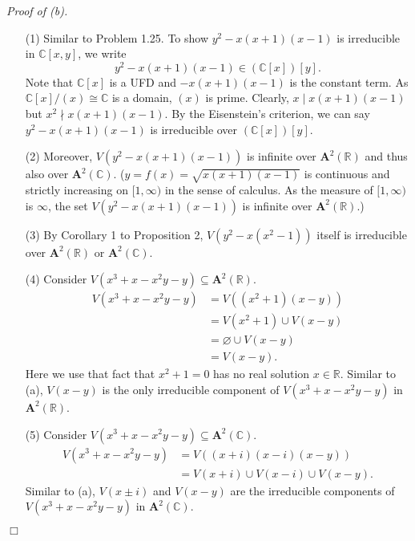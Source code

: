 \documentclass{article}
\begin{document}
\emph{Proof of (b).}
\begin{enumerate}
\item[(1)]
  Similar to Problem 1.25.
  To show $y^2 - x(x+1)(x-1)$ is irreducible in $\mathbb{C}[x,y]$,
  we write
  \[
    y^2 - x(x+1)(x-1) \in (\mathbb{C}[x])[y].
  \]
  Note that $\mathbb{C}[x]$ is a UFD and $-x(x+1)(x-1)$ is the constant term.
  As $\mathbb{C}[x]/(x) \cong \mathbb{C}$ is a domain, $(x)$ is prime.
  Clearly, $x \mid x(x+1)(x-1)$ but $x^2 \nmid x(x+1)(x-1)$.
  By the Eisenstein's criterion,
  we can say $y^2 - x(x+1)(x-1)$ is irreducible over $(\mathbb{C}[x])[y]$.

\item[(2)]
  Moreover, $V(y^2 - x(x+1)(x-1))$ is infinite over $\mathbf{A}^2(\mathbb{R})$
  and thus also over $\mathbf{A}^2(\mathbb{C})$.
  ($y = f(x) = \sqrt{x(x+1)(x-1)}$ is continuous and strictly increasing on $[1,\infty)$
  in the sense of calculus.
  As the measure of $[1,\infty)$ is $\infty$, the set $V(y^2 - x(x+1)(x-1))$ is infinite
  over $\mathbf{A}^2(\mathbb{R})$.)

\item[(3)]
  By Corollary 1 to Proposition 2,
  $V(y^2 - x(x^2-1))$ itself is irreducible over $\mathbf{A}^2(\mathbb{R})$
  or $\mathbf{A}^2(\mathbb{C})$.

\item[(4)]
  Consider $V(x^3+x-x^2y-y) \subseteq \mathbf{A}^2(\mathbb{R})$.
  \begin{align*}
    V(x^3+x-x^2y-y)
    &= V((x^2 + 1)(x - y)) \\
    &= V(x^2 + 1) \cup V(x - y) \\
    &= \varnothing \cup V(x - y) \\
    &= V(x - y).
  \end{align*}
  Here we use that fact that
  $x^2 + 1 = 0$ has no real solution $x \in \mathbb{R}$.
  Similar to (a), $V(x - y)$ is the only irreducible component of $V(x^3+x-x^2y-y)$
  in $\mathbf{A}^2(\mathbb{R})$.

\item[(5)]
  Consider $V(x^3+x-x^2y-y) \subseteq \mathbf{A}^2(\mathbb{C})$.
  \begin{align*}
    V(x^3+x-x^2y-y)
    &= V((x + i)(x - i)(x - y)) \\
    &= V(x + i) \cup V(x - i) \cup V(x - y).
  \end{align*}
  Similar to (a), $V(x \pm i)$ and $V(x - y)$ are the irreducible components of $V(x^3+x-x^2y-y)$
  in $\mathbf{A}^2(\mathbb{C})$.
\end{enumerate}
$\Box$ \\\\
\end{document}
